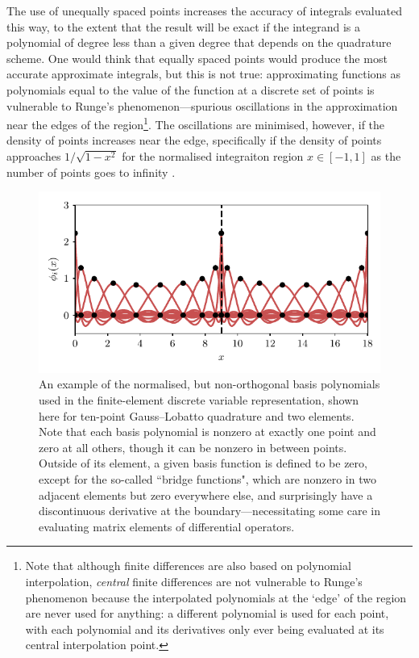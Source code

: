 The use of unequally spaced points increases the accuracy of integrals evaluated this way, to the extent that the result will be exact if the integrand is a polynomial of degree less than a given degree that depends on the quadrature scheme. One would think that equally spaced points would produce the most accurate approximate integrals, but this is not true: approximating functions as polynomials equal to the value of the function at a discrete set of points is vulnerable to Runge's phenomenon---spurious oscillations in the approximation near the edges of the region\footnote{Note that although finite differences are also based on polynomial interpolation, \emph{central} finite differences are not vulnerable to Runge's phenomenon because the interpolated polynomials at the `edge' of the region are never used for anything: a different polynomial is used for each point, with each polynomial and its derivatives only ever being evaluated at its central interpolation point.}. The oscillations are minimised, however, if the density of points increases near the edge, specifically if the density of points approaches $1/\sqrt{1 - x^2}$ for the normalised integraiton region $x \in [-1, 1]$ as the number of points goes to infinity \cite{berrut_barycentric_2004}. 

\begin{figure}[t]
    \centerfloat
    \includegraphics{figures/numerics/fedvr_basis.pdf}
    \caption{An example of the normalised, but non-orthogonal basis polynomials used in the finite-element discrete variable representation, shown here for ten-point Gauss--Lobatto quadrature and two elements. Note that each basis polynomial is nonzero at exactly one point and zero at all others, though it can be nonzero in between points. Outside of its element, a given basis function is defined to be zero, except for the so-called ``bridge functions", which are nonzero in two adjacent elements but zero everywhere else, and surprisingly have a discontinuous derivative at the boundary---necessitating some care in evaluating matrix elements of differential operators.}
    \label{fig:fedvr_basis}
\end{figure}

